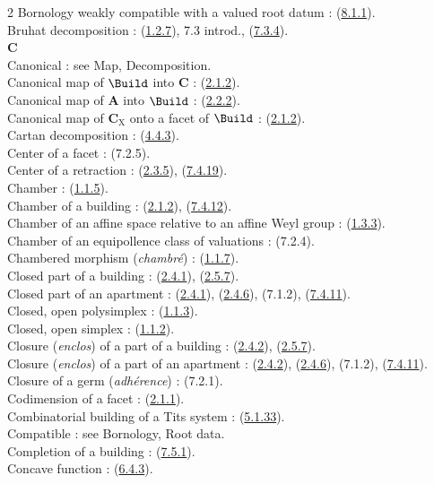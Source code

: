 \documentclass[12pt,a4paper,oneside,english]{smfart}
\newcommand{\btref}[1]{\hyperlink{bt:#1}{#1}}
\theoremstyle{definition}
\theoremstyle{bt}
\begin{document}
\begin{multicols}{2}
Bornology weakly compatible with a valued root datum : (\btref{8.1.1}).\\
Bruhat decomposition : (\btref{1.2.7}), 7.3 introd., (\btref{7.3.4}).\\
\textbf{C}\\
Canonical : see Map, Decomposition.\\
Canonical map of $\Build$ into $\mathbf{C}$ : (\btref{2.1.2}).\\
Canonical map of $\mathbf{A}$ into $\Build$ : (\btref{2.2.2}).\\
Canonical map of $\mathbf{C}_{\mathrm{X}}$ onto a facet of $\Build$ : (\btref{2.1.2}).\\
Cartan decomposition : (\btref{4.4.3}).\\
Center of a facet : (7.2.5).\\
Center of a retraction : (\btref{2.3.5}), (\btref{7.4.19}).\\
Chamber : (\btref{1.1.5}).\\
Chamber of a building : (\btref{2.1.2}), (\btref{7.4.12}).\\
Chamber of an affine space relative to an affine Weyl group : (\btref{1.3.3}).\\
Chamber of an equipollence class of valuations : (7.2.4).\\
Chambered morphism (\emph{chambré}) : (\btref{1.1.7}).\\
Closed part of a building : (\btref{2.4.1}), (\btref{2.5.7}).\\
Closed part of an apartment : (\btref{2.4.1}), (\btref{2.4.6}), (7.1.2), (\btref{7.4.11}).\\
Closed, open polysimplex : (\btref{1.1.3}).\\
Closed, open simplex : (\btref{1.1.2}).\\
Closure (\emph{enclos}) of a part of a building : (\btref{2.4.2}), (\btref{2.5.7}).\\
Closure (\emph{enclos}) of a part of an apartment : (\btref{2.4.2}), (\btref{2.4.6}), (7.1.2), (\btref{7.4.11}).\\
Closure of a germ (\emph{adhérence}) : (7.2.1).\\
Codimension of a facet : (\btref{2.1.1}).\\
Combinatorial building of a Tits system : (\btref{5.1.33}).\\
Compatible : see Bornology, Root data.\\
Completion of a building : (\btref{7.5.1}).\\
Concave function : (\btref{6.4.3}).\\

\end{multicols}
\end{document}
